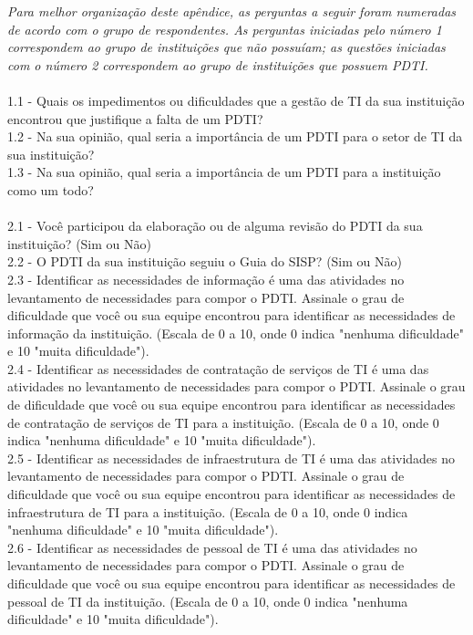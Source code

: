 \textit{Para melhor organização deste apêndice, as perguntas a seguir foram numeradas de acordo com o grupo de respondentes. As perguntas iniciadas pelo número 1 correspondem ao grupo de instituições que não possuíam; as questões iniciadas com o número 2 correspondem ao grupo de instituições que possuem PDTI.}
\\
\\1.1 - Quais os impedimentos ou dificuldades que a gestão de TI da sua instituição encontrou que justifique a falta de um PDTI?
\\1.2 - Na sua opinião, qual seria a importância de um PDTI para o setor de TI da sua instituição?
\\1.3 - Na sua opinião, qual seria a importância de um PDTI para a instituição como um todo?
\\
\\2.1 - Você participou da elaboração ou de alguma revisão do PDTI da sua instituição? (Sim ou Não)
\\2.2 - O PDTI da sua instituição seguiu o Guia do SISP? (Sim ou Não)
\\2.3 - Identificar as necessidades de informação é uma das atividades no levantamento de necessidades para compor o PDTI. Assinale o grau de dificuldade que você ou sua equipe encontrou para identificar as necessidades de informação da instituição. (Escala de 0 a 10, onde 0 indica "nenhuma dificuldade" e 10 "muita dificuldade").
\\2.4 - Identificar as necessidades de contratação de serviços de TI é uma das atividades no levantamento de necessidades para compor o PDTI. Assinale o grau de dificuldade que você ou sua equipe encontrou para identificar as necessidades de contratação de serviços de TI para a instituição. (Escala de 0 a 10, onde 0 indica "nenhuma dificuldade" e 10 "muita dificuldade").
\\2.5 - Identificar as necessidades de infraestrutura de TI é uma das atividades no levantamento de necessidades para compor o PDTI. Assinale o grau de dificuldade que você ou sua equipe encontrou para identificar as necessidades de infraestrutura de TI para a instituição. (Escala de 0 a 10, onde 0 indica "nenhuma dificuldade" e 10 "muita dificuldade").
\\2.6 - Identificar as necessidades de pessoal de TI é uma das atividades no levantamento de necessidades para compor o PDTI. Assinale o grau de dificuldade que você ou sua equipe encontrou para identificar as necessidades de pessoal de TI da instituição. (Escala de 0 a 10, onde 0 indica "nenhuma dificuldade" e 10 "muita dificuldade").
